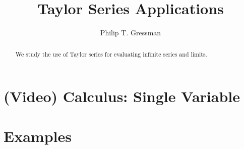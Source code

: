 \documentclass{ximera}
\title{Taylor Series Applications}
\author{Philip T. Gressman}
\begin{document}
\begin{abstract}
We study the use of Taylor series for evaluating infinite series and limits.
\end{abstract}
\maketitle

\section*{(Video) Calculus: Single Variable}

\section*{Examples}

\begin{example}

\end{example}

\begin{example}

\end{example}
\end{document}
